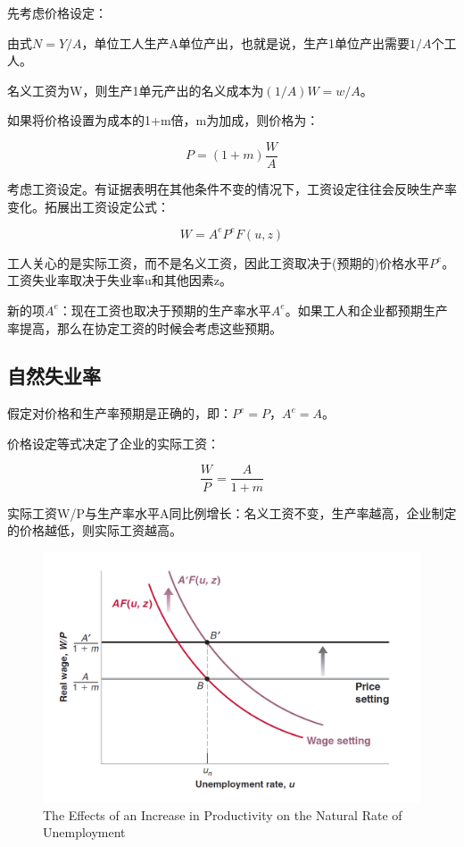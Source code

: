 \documentclass{article}
\begin{document}
先考虑价格设定：

由式$ N=Y/A $，单位工人生产A单位产出，也就是说，生产1单位产出需要$ 1/A $个工人。

名义工资为W，则生产1单元产出的名义成本为$ (1/A)W=w/A $。

如果将价格设置为成本的1+m倍，m为加成，则价格为：

\[
P=(1+m)\frac{W}{A}
\]

考虑工资设定。有证据表明在其他条件不变的情况下，工资设定往往会反映生产率变化。拓展出工资设定公式：

\[
W=A^eP^eF(u,z)
\]

工人关心的是实际工资，而不是名义工资，因此工资取决于(预期的)价格水平$ P^e $。工资失业率取决于失业率u和其他因素z。

新的项$ A^e $：现在工资也取决于预期的生产率水平$ A^e $。如果工人和企业都预期生产率提高，那么在协定工资的时候会考虑这些预期。

\subsection{自然失业率}

假定对价格和生产率预期是正确的，即：$ P^e=P $，$ A^e=A $。

价格设定等式决定了企业的实际工资：

\[
\frac{W}{P}=\frac{A}{1+m}
\]

实际工资W/P与生产率水平A同比例增长：名义工资不变，生产率越高，企业制定的价格越低，则实际工资越高。

\begin{figure}[H] %
	\centering %
	\includegraphics[width=1\textwidth]{13_2} %
	\caption{The Effects of an Increase
		in Productivity on
		the Natural Rate of
		Unemployment} %
	\label{Fig.main3} %
\end{figure}
\end{document}
